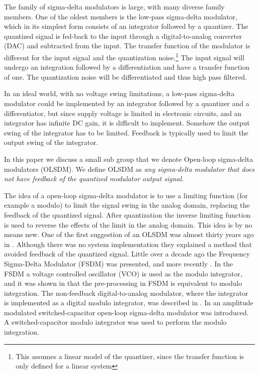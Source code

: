 The family of sigma-delta modulators is large, with
many diverse family members. One of the oldest members is the low-pass
sigma-delta modulator, which in its simplest form consists of an
integrator followed by a quantizer. The quantized signal is fed-back
to the input through a digital-to-analog converter (DAC) and subtracted from
the input. The transfer function of the modulator is different for the
input signal and the quantization noise.\footnote{This assumes a linear model of the quantizer,
  since the transfer function is only defined for a linear system} The input
signal will undergo an integration followed by a
differentiation and have a transfer function of one. The quantization noise will be
differentiated and thus high pass filtered. 

In an ideal world, with no voltage swing limitations, a low-pass
sigma-delta modulator
could be implemented by an integrator 
followed by a quantizer and a differentiator, but since supply voltage
is limited in electronic circuits, and an integrator  
has infinite DC gain, it is difficult to implement. Somehow
the output swing of the integrator has to be limited. Feedback is
typically used to limit the output swing of the integrator. 
 
In this
paper we discuss a small sub group that we denote Open-loop sigma-delta
modulators (OLSDM).  We define OLSDM as \textit{any sigma-delta modulator that does
not have feedback of the quantized modulator output signal}. 

The idea of a open-loop sigma-delta modulator is to use a limiting
function (for example a modulo) to limit the signal swing in the
analog domain, replacing the feedback of the quantized signal. After
quantization  the inverse limiting function is used to reverse the
effects of the limit in the analog domain. This idea is
by no means new. One of the first suggestion of an OLSDM was almost thirty years ago in
\cite{claasen80}. Although there was no system 
implementation they explained a method that avoided feedback of the
quantized signal. Little over a decade ago the  Frequency
Sigma-Delta Modulator (FSDM) \cite{hovin97.2} was presented, and more
recently \cite{wismar07a}. 
In the FSDM a voltage controlled
oscillator (VCO) is used as the modulo integrator, and it was shown in \cite{hovin97.2} that the pre-processing
in FSDM is equivalent to modulo integration. 
The
non-feedback \SD digital-to-analog modulator, where the
integrator is implemented as a digital modulo integrator, was
described in \cite{wisland03a}. 
In \cite{wulff08a} an amplitude modulated switched-capacitor open-loop
sigma-delta modulator was introduced. A switched-capacitor 
modulo integrator was used to perform the modulo integration.

